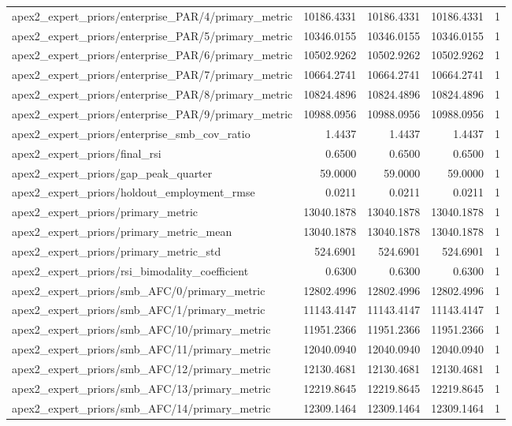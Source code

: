\begin{table}[h]
\begin{tabular}{lrrrr}
apex2_expert_priors/enterprise_PAR/4/primary_metric & 10186.4331 & 10186.4331 & 10186.4331 & 1 \\
apex2_expert_priors/enterprise_PAR/5/primary_metric & 10346.0155 & 10346.0155 & 10346.0155 & 1 \\
apex2_expert_priors/enterprise_PAR/6/primary_metric & 10502.9262 & 10502.9262 & 10502.9262 & 1 \\
apex2_expert_priors/enterprise_PAR/7/primary_metric & 10664.2741 & 10664.2741 & 10664.2741 & 1 \\
apex2_expert_priors/enterprise_PAR/8/primary_metric & 10824.4896 & 10824.4896 & 10824.4896 & 1 \\
apex2_expert_priors/enterprise_PAR/9/primary_metric & 10988.0956 & 10988.0956 & 10988.0956 & 1 \\
apex2_expert_priors/enterprise_smb_cov_ratio & 1.4437 & 1.4437 & 1.4437 & 1 \\
apex2_expert_priors/final_rsi & 0.6500 & 0.6500 & 0.6500 & 1 \\
apex2_expert_priors/gap_peak_quarter & 59.0000 & 59.0000 & 59.0000 & 1 \\
apex2_expert_priors/holdout_employment_rmse & 0.0211 & 0.0211 & 0.0211 & 1 \\
apex2_expert_priors/primary_metric & 13040.1878 & 13040.1878 & 13040.1878 & 1 \\
apex2_expert_priors/primary_metric_mean & 13040.1878 & 13040.1878 & 13040.1878 & 1 \\
apex2_expert_priors/primary_metric_std & 524.6901 & 524.6901 & 524.6901 & 1 \\
apex2_expert_priors/rsi_bimodality_coefficient & 0.6300 & 0.6300 & 0.6300 & 1 \\
apex2_expert_priors/smb_AFC/0/primary_metric & 12802.4996 & 12802.4996 & 12802.4996 & 1 \\
apex2_expert_priors/smb_AFC/1/primary_metric & 11143.4147 & 11143.4147 & 11143.4147 & 1 \\
apex2_expert_priors/smb_AFC/10/primary_metric & 11951.2366 & 11951.2366 & 11951.2366 & 1 \\
apex2_expert_priors/smb_AFC/11/primary_metric & 12040.0940 & 12040.0940 & 12040.0940 & 1 \\
apex2_expert_priors/smb_AFC/12/primary_metric & 12130.4681 & 12130.4681 & 12130.4681 & 1 \\
apex2_expert_priors/smb_AFC/13/primary_metric & 12219.8645 & 12219.8645 & 12219.8645 & 1 \\
apex2_expert_priors/smb_AFC/14/primary_metric & 12309.1464 & 12309.1464 & 12309.1464 & 1 \\

\end{tabular}
\end{table}
